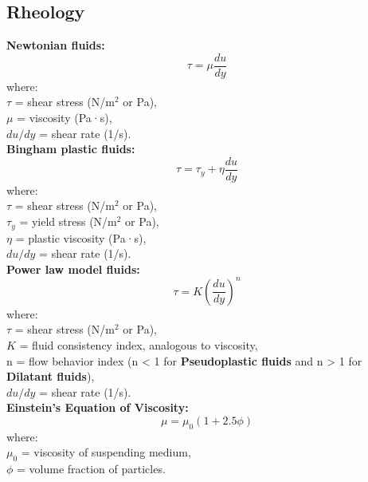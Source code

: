 \documentclass[a4paper, landscape]{article}
\begin{document}
\begin{multicols}{4}
\subsection*{Rheology}
\textbf{Newtonian fluids:}
\[
\tau = \mu \frac{du}{dy}
\]
where:\\
$\tau$ = shear stress (N/m$^2$ or Pa),\\
$\mu$ = viscosity (Pa·s),\\
$du/dy$ = shear rate (1/s).\\
\textbf{Bingham plastic fluids:}
\[
\tau = \tau_y + \eta \frac{du}{dy}
\]
where:\\
$\tau$ = shear stress (N/m$^2$ or Pa),\\
$\tau_y$ = yield stress (N/m$^2$ or Pa),\\
$\eta$ = plastic viscosity (Pa·s),\\
$du/dy$ = shear rate (1/s).\\
\textbf{Power law model fluids:}
\[
\tau = K \left(\frac{du}{dy}\right)^n
\]
where:\\
$\tau$ = shear stress (N/m$^2$ or Pa),\\
$K$ = fluid consistency index, analogous to viscosity,\\
n = flow behavior index (n < 1 for \textbf{Pseudoplastic fluids} and n > 1 for \textbf{Dilatant fluids}),\\
$du/dy$ = shear rate (1/s).\\
\textbf{Einstein's Equation of Viscosity:}
\[
\mu = \mu_0 (1+2.5\phi)
\]
where:\\
$\mu_0$ = viscosity of suspending medium,\\
$\phi$ = volume fraction of particles.

\end{multicols}
\end{document}
